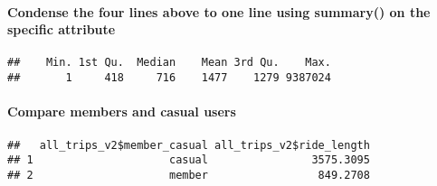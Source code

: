 \documentclass[
]{article}
\newenvironment{Shaded}{\begin{snugshade}}{\end{snugshade}}
\newcommand{\AttributeTok}[1]{\textcolor[rgb]{0.77,0.63,0.00}{#1}}
\newcommand{\FunctionTok}[1]{\textcolor[rgb]{0.00,0.00,0.00}{#1}}
\newcommand{\NormalTok}[1]{#1}
\newcommand{\SpecialCharTok}[1]{\textcolor[rgb]{0.00,0.00,0.00}{#1}}
\begin{document}
\hypertarget{condense-the-four-lines-above-to-one-line-using-summary-on-the-specific-attribute}{%
\paragraph{Condense the four lines above to one line using summary() on
the specific
attribute}\label{condense-the-four-lines-above-to-one-line-using-summary-on-the-specific-attribute}}

\begin{Shaded}
\end{Shaded}

\begin{verbatim}
##    Min. 1st Qu.  Median    Mean 3rd Qu.    Max. 
##       1     418     716    1477    1279 9387024
\end{verbatim}

\hypertarget{compare-members-and-casual-users}{%
\paragraph{Compare members and casual
users}\label{compare-members-and-casual-users}}

\begin{Shaded}
\end{Shaded}

\begin{verbatim}
##   all_trips_v2$member_casual all_trips_v2$ride_length
## 1                     casual                3575.3095
## 2                     member                 849.2708
\end{verbatim}

\begin{Shaded}
\end{Shaded}
\end{document}
